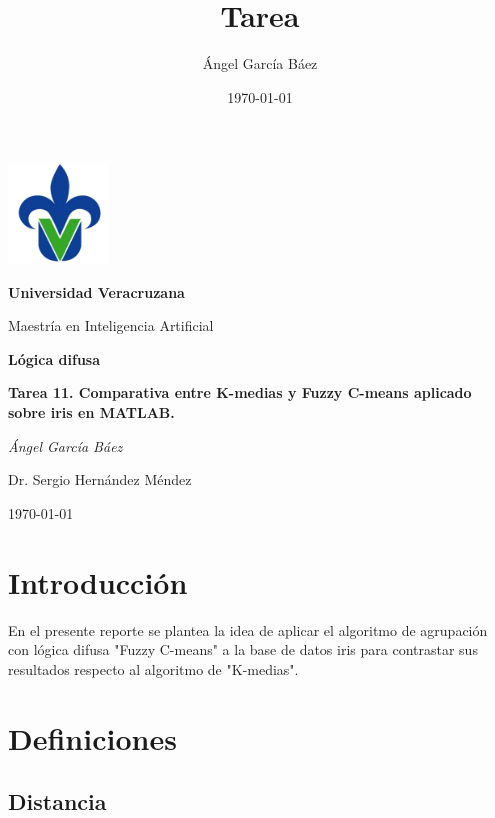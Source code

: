 \documentclass[11pt, letterpaper]{article}
\title{\bfseries Tarea}
\author{Ángel García Báez}
\date{\today}
\begin{document}
	
	\begin{titlepage}
		\centering
		\includegraphics[width=0.2\textwidth]{logo.png}\par
		\vspace{1cm}
		{\LARGE \bfseries Universidad Veracruzana \par}
		\vspace{1cm}
		{\Large Maestría en Inteligencia Artificial\par}
		\vspace{3cm}
		{\LARGE \bfseries Lógica difusa \par}
		\vspace{1cm}
		{\Large \bfseries Tarea 11. Comparativa entre K-medias y Fuzzy C-means aplicado sobre iris en MATLAB. \par}
		\vfill
		{\Large \textit{Ángel García Báez}\par}
		\vfill
		{\Large Dr. Sergio Hernández Méndez \par}
		\vfill
		{\Large \today \par}
	\end{titlepage}
	
	\newpage
	\tableofcontents
	\newpage
	

\section{Introducción}

En el presente reporte se plantea la idea de aplicar el  algoritmo de agrupación con lógica difusa "Fuzzy C-means" a la base de datos iris para contrastar sus resultados respecto al algoritmo de "K-medias".




\newpage

\section{Definiciones}

\subsection{Distancia}
\end{document}
